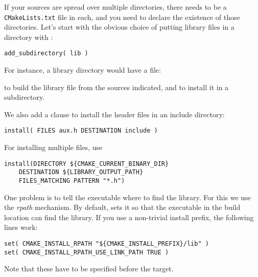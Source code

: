 \begin{floatingfigure}[r]{2.5in}
  \begin{minipage}{2.5in}
  \end{minipage}
\end{floatingfigure}
%
If your sources are spread over multiple directories,
there needs to be a \texttt{CMakeLists.txt} file in each,
and you need to declare the existence of those directories.
Let's start with the obvious choice of putting library files in a  directory
with :
\begin{lstlisting}
add_subdirectory( lib )
\end{lstlisting}
For instance, a library directory would have a  file:
%

%
to build the library file from the sources indicated,
and to install it in a  subdirectory.

We also add a clause to install the header files in an include directory:
\begin{lstlisting}
install( FILES aux.h DESTINATION include )
\end{lstlisting}
For installing multiple files, use
\begin{lstlisting}
install(DIRECTORY ${CMAKE_CURRENT_BINARY_DIR}
    DESTINATION ${LIBRARY_OUTPUT_PATH}
    FILES_MATCHING PATTERN "*.h")
\end{lstlisting}

One problem is to tell the executable where to find the library.
For this we use the
\emph{rpath}
mechanism.
By default,  sets it so that the executable in the build location
can find the library.
If you use a non-trivial install prefix, the following lines work:
\begin{lstlisting}
set( CMAKE_INSTALL_RPATH "${CMAKE_INSTALL_PREFIX}/lib" )
set( CMAKE_INSTALL_RPATH_USE_LINK_PATH TRUE )
\end{lstlisting}
Note that these have to be specified before the target.

